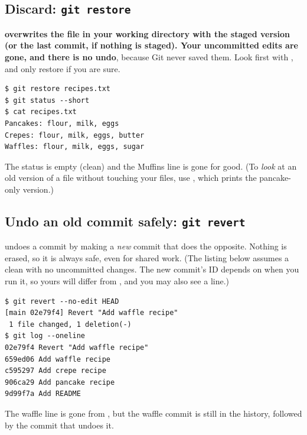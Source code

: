 \subsection{Discard: \texttt{git restore}}

\begin{pitfall}
\textbf{ overwrites the file in your working directory with the staged version (or the last commit, if nothing is staged). Your uncommitted edits are gone, and there is no undo}, because Git never saved them. Look first with , and only restore if you are sure.
\end{pitfall}

\begin{lstlisting}
$ git restore recipes.txt
$ git status --short
$ cat recipes.txt
Pancakes: flour, milk, eggs
Crepes: flour, milk, eggs, butter
Waffles: flour, milk, eggs, sugar
\end{lstlisting}

The status is empty (clean) and the Muffins line is gone for good. (To \emph{look} at an old version of a file without touching your files, use , which prints the pancake-only version.)

\subsection{Undo an old commit safely: \texttt{git revert}}

 undoes a commit by making a \emph{new} commit that does the opposite. Nothing is erased, so it is always safe, even for shared work. (The listing below assumes a clean  with no uncommitted changes. The new commit's ID depends on when you run it, so yours will differ from , and you may also see a  line.)

\begin{lstlisting}
$ git revert --no-edit HEAD
[main 02e79f4] Revert "Add waffle recipe"
 1 file changed, 1 deletion(-)
$ git log --oneline
02e79f4 Revert "Add waffle recipe"
659ed06 Add waffle recipe
c595297 Add crepe recipe
906ca29 Add pancake recipe
9d99f7a Add README
\end{lstlisting}

The waffle line is gone from , but the waffle commit is still in the history, followed by the commit that undoes it.


